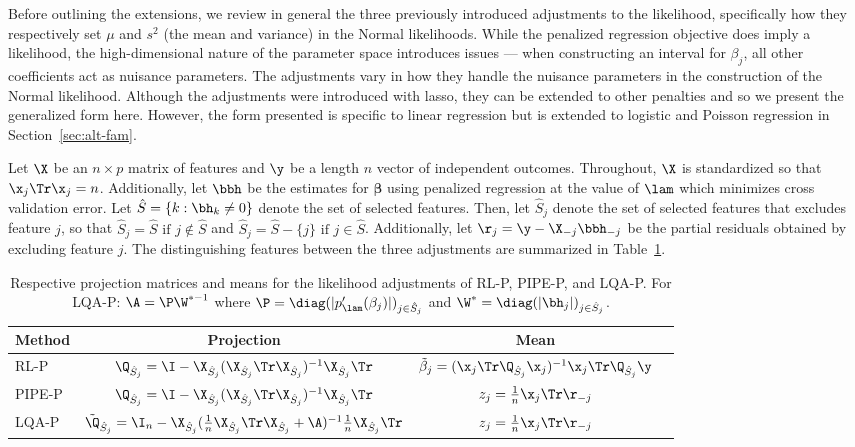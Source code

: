 Before outlining the extensions, we review in general the three previously introduced adjustments to the likelihood, specifically how they respectively set $\mu$ and $s^2$ (the mean and variance) in the Normal likelihoods. While the penalized regression objective does imply a likelihood, the high-dimensional nature of the parameter space introduces issues --- when constructing an interval for $\beta_j$, all other coefficients act as nuisance parameters. The adjustments vary in how they handle the nuisance parameters in the construction of the Normal likelihood. Although the adjustments were introduced with lasso, they can be extended to other penalties and so we present the generalized form here. However, the form presented is specific to linear regression but is extended to logistic and Poisson regression in Section~\ref{sec:alt-fam}.

Let $\X$ be an $n \times p$ matrix of features and $\y$ be a length $n$ vector of independent outcomes. Throughout, $\X$ is standardized so that $\x_j \Tr \x_j = n$. Additionally, let $\bbh$ be the estimates for $\boldsymbol{\beta}$ using penalized regression at the value of $\lam$ which minimizes cross validation error. Let $\hat{S} = \lbrace k: \bh_k \neq  0 \rbrace$ denote the set of selected features. Then, let $\hat{S}_j$ denote the set of selected features that excludes feature $j$, so that $\hat{S}_j = \hat{S} \text{ if } j \notin \hat{S}$ and $\hat{S}_j = \hat{S} - \lbrace j \rbrace \text{ if } j \in \hat{S}$. Additionally, let $\r_j = \y - \X_{-j}\bbh_{-j}$ be the partial residuals obtained by excluding feature $j$. The distinguishing features between the three adjustments are summarized in Table~\ref{tab:review}.

\begin{table}[ht]
\centering
\begin{tabular}{lccc}
\toprule
\textbf{Method} & \textbf{Projection} & \textbf{Mean} \\
\midrule
RL-P   & $\Q_{\hat{S}_j} = \I - \X_{\hat{S}_j}(\X_{\hat{S}_j} \Tr \X_{\hat{S}_j})^{-1} \X_{\hat{S}_j} \Tr$ & $\tilde{\beta}_j = (\x_j \Tr \Q_{\hat{S}_j} \x_j)^{-1} \x_j \Tr \Q_{\hat{S}_j} \y$  \\
PIPE-P & $\Q_{\hat{S}_j} = \I - \X_{\hat{S}_j}(\X_{\hat{S}_j} \Tr \X_{\hat{S}_j})^{-1} \X_{\hat{S}_j} \Tr$ & $z_j = \tfrac{1}{n}\x_j \Tr\r_{-j}$ \\
LQA-P  & $\tilde{\Q}_{\hat{S}_j} = \I_n - \X_{\hat{S}_j}(\tfrac{1}{n}\X_{\hat{S}_j} \Tr\X_{\hat{S}_j} + \A)^{-1}\tfrac{1}{n}\X_{\hat{S}_j} \Tr$ & $z_j = \tfrac{1}{n}\x_j \Tr\r_{-j}$ \\
\bottomrule
\end{tabular}
\caption{Respective projection matrices and means for the likelihood adjustments of RL-P, PIPE-P, and LQA-P. For LQA-P: $\A = \P \W^{*-1}$ where $\P = \diag(|p'_\lam(\beta_j)|)_{j \in \hat{S}_j}$ and $\W^* = \diag(|\bh_j|)_{j \in \hat{S}_j}$.}
\label{tab:review}
\end{table}

